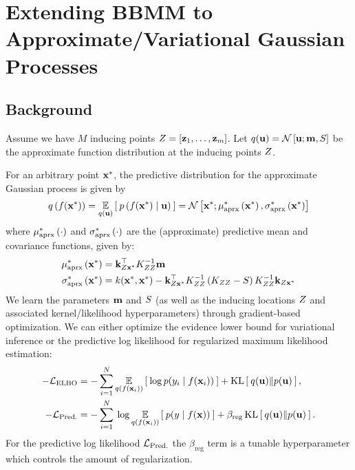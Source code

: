 \chapter{Extending BBMM to Approximate/Variational Gaussian Processes}
\label{chapter:variational}

\section{Background}

Assume we have $M$ inducing points $Z = [\mathbf{z}_1, \ldots, \mathbf{z}_m]$.
Let $q(\mathbf{u}) = \mathcal{N} \left[ \mathbf{u}; \mathbf{m}, S \right]$ be the approximate function distribution at the inducing points $Z$.

For an arbitrary point $\mathbf{x}^*$, the predictive distribution for the approximate Gaussian process is given by
%
\begin{equation}
  q \left( f(\mathbf{x}^*) \right) = \operatorname*{\mathbb{E}}_{q(\mathbf{u})} \left[  \: p\left( f(\mathbf{x}^*) \mid \mathbf{u} \right) \:  \right]
  = \mathcal{N} \left[  \mathbf{x}^*; \mu^*_\text{aprx} \left(  \mathbf{x}^*  \right),  \sigma^*_\text{aprx} \left(  \mathbf{x}^*  \right) \right]
  \label{eqn:approx_pred}
\end{equation}
%
where $\mu^*_\text{aprx} \left( \cdot \right)$ and $\sigma^*_\text{aprx} \left( \cdot \right)$ are the (approximate) predictive mean and covariance functions, given by:
%
\begin{align}
  \mu^*_\text{aprx} \left( \mathbf{x}^* \right) &= \mathbf{k}_{Z\mathbf{x}^*}^\top K_{ZZ}^{-1} \mathbf{m}
  \label{eqn:approx_pred_mean} \\
  \sigma^*_\text{aprx} \left( \mathbf{x}^* \right) &= k(\mathbf{x}^*, \mathbf{x}^*) -
    \mathbf{k}_{Z\mathbf{x}^*}^\top K_{ZZ}^{-1} \left( K_{ZZ} - S \right) K_{ZZ}^{-1} \mathbf{k}_{Z\mathbf{x}^*}
  \label{eqn:approx_pred_covar}
\end{align}
%
We learn the parameters $\mathbf{m}$ and $S$ (as well as the inducing locations $Z$ and associated kernel/likelihood hyperparameters) through gradient-based optimization.
We can either optimize the evidence lower bound \cite{hensman2015scalable} for variational inference or the predictive log likelihood \cite{jankowiak2020parametric} for regularized maximum likelihood estimation:
%
\begin{align}
	-\mathcal L_\text{ELBO} &= -\sum_{i=1}^N \operatorname*{\mathbb{E}}_{q(f(\mathbf{x}_i))} \left[   \: \log p( y_i \mid f(\mathbf{x}_i) ) \:  \right] + \operatorname*{KL} \left[ \:  q(\mathbf{u})  \Vert  p(\mathbf{u})  \: \right],
	\label{eqn:elbo}
	\\
	-\mathcal L_\text{Pred.} &= -\sum_{i=1}^N \: \log \operatorname*{\mathbb{E}}_{q(f(\mathbf{x}_i))} \left[   \: p( y \mid f(\mathbf{x}) ) \:  \right] + \beta_\text{reg} \operatorname*{KL} \left[ \:  q(\mathbf{u})  \Vert  p(\mathbf{u})  \: \right].
	\label{eqn:predll}
\end{align}
%
For the predictive log likelihood $\mathcal L_\text{Pred.}$ the $\beta_\text{reg}$ term is a tunable hyperparameter which controls the amount of regularization.



